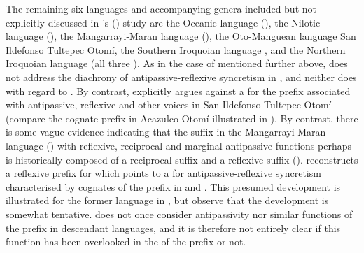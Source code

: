 The remaining six languages and accompanying genera included but not explicitly discussed in \citeauthor{sanso:2017}’s (\citeyear{sanso:2017}) study are the Oceanic language  (), the Nilotic language  (), the Mangarrayi-Maran language  (), the Oto-Manguean language San Ildefonso Tultepec Otomí, the Southern Iroquoian language , and the Northern Iroquoian language  (all three ). As in the case of  mentioned further above, \citet{barbor:2012} does not address the diachrony of antipassive-reflexive syncretism in , and neither does \citet{storch:2014} with regard to . By contrast, \citet[157ff.]{palancar:2009} explicitly argues against a  for the prefix  associated with antipassive, reflexive and other voices in San Ildefonso Tultepec Otomí (compare the cognate prefix in Acazulco Otomí illustrated in ). By contrast, there is some vague evidence indicating that the suffix  in the Mangarrayi-Maran language  () with reflexive, reciprocal and marginal antipassive functions perhaps is historically composed of a reciprocal suffix  and a reflexive suffix  (). \citet{julian:2010} reconstructs a reflexive prefix  for  which points to a  for antipassive-reflexive syncretism characterised by cognates of the prefix in  and . This presumed development is illustrated for the former language in  \citep[343ff., 366, 371]{montgomery-anderson:2008}, but observe that the development is somewhat tentative. \citet{julian:2010} does not once consider antipassivity nor similar functions of the prefix in descendant languages, and it is therefore not entirely clear if this function has been overlooked in the  of the  prefix or not.

